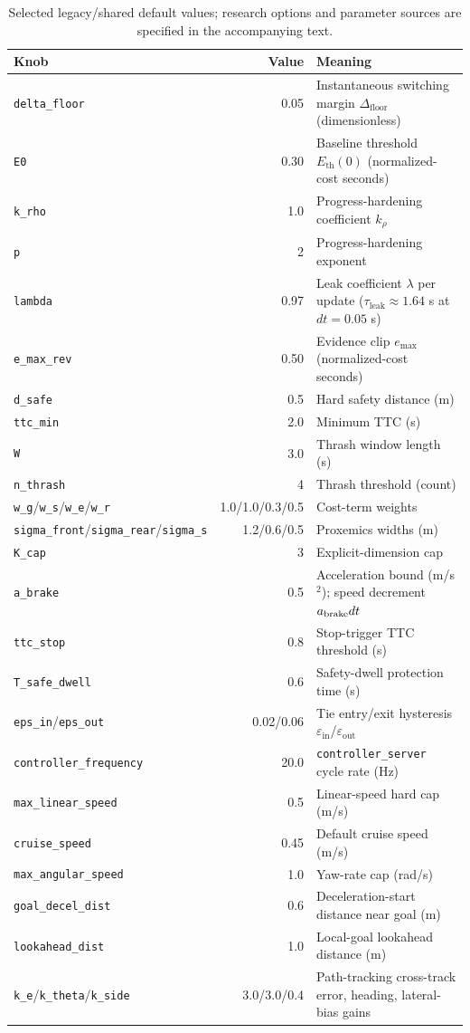 \documentclass[11pt]{article}
\newcommand{\Dfloor}{\Delta_{\text{floor}}}
\newcommand{\Eth}{E_{\text{th}}}
\newcommand{\code}[1]{\texttt{#1}}
\begin{document}
\begin{table}[H]
\centering
\caption{Selected legacy/shared default values; research options and parameter sources are specified in the accompanying text.}
\label{tab:params}
\small
\begin{tabular}{@{}lrp{}@{}}
\toprule
Knob & Value & Meaning \\
\midrule
\code{delta\_floor} & 0.05 & Instantaneous switching margin $\Dfloor$ (dimensionless) \\
\code{E0} & 0.30 & Baseline threshold $\Eth(0)$ (normalized-cost seconds) \\
\code{k\_rho} & 1.0 & Progress-hardening coefficient $k_\rho$ \\
\code{p} & 2 & Progress-hardening exponent \\
\code{lambda} & 0.97 & Leak coefficient $\lambda$ per update ($\tau_{\text{leak}} \approx 1.64$ s at $dt=0.05$ s) \\
\code{e\_max\_rev} & 0.50 & Evidence clip $e_{\max}$ (normalized-cost seconds) \\
\code{d\_safe} & 0.5 & Hard safety distance (m) \\
\code{ttc\_min} & 2.0 & Minimum TTC (s) \\
\code{W} & 3.0 & Thrash window length (s) \\
\code{n\_thrash} & 4 & Thrash threshold (count) \\
\code{w\_g}/\code{w\_s}/\code{w\_e}/\code{w\_r} & 1.0/1.0/0.3/0.5 & Cost-term weights \\
\code{sigma\_front}/\code{sigma\_rear}/\code{sigma\_s} & 1.2/0.6/0.5 & Proxemics widths (m) \\
\code{K\_cap} & 3 & Explicit-dimension cap \\
\code{a\_brake} & 0.5 & Acceleration bound (m/s$^2$); speed decrement $a_{\rm brake}dt$ \\
\code{ttc\_stop} & 0.8 & Stop-trigger TTC threshold (s) \\
\code{T\_safe\_dwell} & 0.6 & Safety-dwell protection time (s) \\
\code{eps\_in}/\code{eps\_out} & 0.02/0.06 & Tie entry/exit hysteresis $\varepsilon_{\text{in}}$/$\varepsilon_{\text{out}}$ \\
\code{controller\_frequency} & 20.0 & \code{controller\_server} cycle rate (Hz) \\
\code{max\_linear\_speed} & 0.5 & Linear-speed hard cap (m/s) \\
\code{cruise\_speed} & 0.45 & Default cruise speed (m/s) \\
\code{max\_angular\_speed} & 1.0 & Yaw-rate cap (rad/s) \\
\code{goal\_decel\_dist} & 0.6 & Deceleration-start distance near goal (m) \\
\code{lookahead\_dist} & 1.0 & Local-goal lookahead distance (m) \\
\code{k\_e}/\code{k\_theta}/\code{k\_side} & 3.0/3.0/0.4 & Path-tracking cross-track error, heading, lateral-bias gains \\
\bottomrule
\end{tabular}
\end{table}
\end{document}
